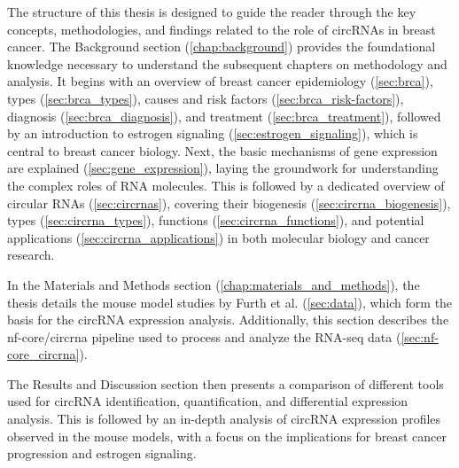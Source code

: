 The structure of this thesis is designed to guide the reader through the key
concepts, methodologies, and findings related to the role of circRNAs in breast
cancer.
The Background section (\cref{chap:background}) provides the foundational
knowledge necessary to understand the subsequent chapters on methodology and
analysis.
It begins with an overview of breast cancer epidemiology (\cref{sec:brca}),
types (\cref{sec:brca_types}), causes and risk factors
(\cref{sec:brca_risk-factors}), diagnosis (\cref{sec:brca_diagnosis}), and
treatment (\cref{sec:brca_treatment}), followed by an introduction to estrogen
signaling (\cref{sec:estrogen_signaling}), which is central to breast cancer
biology.
Next, the basic mechanisms of gene expression are explained
(\cref{sec:gene_expression}), laying the groundwork for understanding the
complex roles of RNA molecules.
This is followed by a dedicated overview of circular RNAs
(\cref{sec:circrnas}), covering their biogenesis
(\cref{sec:circrna_biogenesis}), types (\cref{sec:circrna_types}), functions
(\cref{sec:circrna_functions}), and potential applications
(\cref{sec:circrna_applications}) in both molecular biology and cancer
research.

In the Materials and Methods section (\cref{chap:materials_and_methods}), the
thesis details the mouse model studies by Furth et al.
\supercite{furth_esr1_2023,furth_overexpression_2023} (\cref{sec:data}),
which form the basis for the circRNA expression
analysis.
Additionally, this section describes the nf-core/circrna
pipeline\supercite{digby_nf-corecircrna_2023} used to process and analyze the
RNA-seq data (\cref{sec:nf-core_circrna}).

The Results and Discussion section then presents a comparison of different
tools used for circRNA identification, quantification, and differential
expression analysis.
This is followed by an in-depth analysis of circRNA expression profiles
observed in the mouse models, with a focus on the implications for breast
cancer progression and estrogen signaling.
